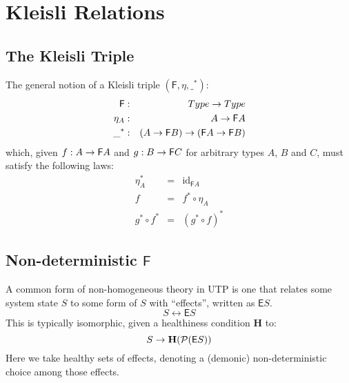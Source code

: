 \section{Kleisli Relations}

\def\F{\mathsf{F}}
\def\E{\mathsf{E}}
\def\id{\mathrm{id}}
\def\H{\mathbf{H}}
\def\He{\mathbb{H}}

\subsection{The Kleisli Triple}

The general notion of a Kleisli triple $(\F,\eta,\_^*)$:
\begin{eqnarray*}
   \F      &:& Type \fun Type
\\ \eta_A &:& A \fun \F A
\\ \_^*   &:&  (A \fun \F B) \fun (\F A \fun \F B)
\end{eqnarray*}
which,
given $ f : A \fun \F A $ and $g : B \fun \F C $
for arbitrary types $A$, $B$ and $C$,
must satisfy the following laws:
\begin{eqnarray*}
   \eta_A^*      &=& \id_{\F A}
\\ f             &=& f^* \circ \eta_A
\\ g^* \circ f^* &=& (g^* \circ f)^*
\end{eqnarray*}

\subsection{Non-deterministic $\F$}

A common form of non-homogeneous theory in UTP is one that relates
some system state $S$ to some form of $S$ with ``effects'', written as $\E S$.
\[
  S \rel \E S
\]
This is typically isomorphic, given a healthiness condition $\H$ to:
\[
  S \fun \H(\power(\E S))
\]
Here we take healthy sets of effects,
denoting a (demonic) non-deterministic choice among those effects.


